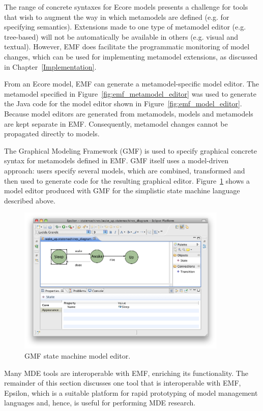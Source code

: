 The range of concrete syntaxes for Ecore models presents a challenge for tools that wish to augment the way in which metamodels are defined (e.g. for specifying semantics). Extensions made to one type of metamodel editor (e.g. tree-based) will not be automatically be available in others (e.g. visual and textual). However, EMF does facilitate the programmatic monitoring of model changes, which can be used for implementing metamodel extensions, as discussed in Chapter~\ref{Implementation}. 

From an Ecore model, EMF can generate a metamodel-specific model editor. The metamodel specified in Figure~\ref{fig:emf_metamodel_editor} was used to generate the Java code for the model editor shown in Figure~\ref{fig:emf_model_editor}. Because model editors are generated from metamodels, models and metamodels are kept separate in EMF. Consequently, metamodel changes cannot be propagated directly to models.

The Graphical Modeling Framework (GMF) \cite{gronback09emp} is used to specify graphical concrete syntax for metamodels defined in EMF. GMF itself uses a model-driven approach: users specify several models, which are combined, transformed and then used to generate code for the resulting graphical editor. Figure~\ref{fig:gmf_model_editor} shows a model editor produced with GMF for the simplistic state machine language described above.

\begin{figure}[htbp]
  \begin{center}
    \leavevmode
    \includegraphics[width=10cm]{2.Background/images/gmf_model_editor.png}
  \end{center}
  \caption{GMF state machine model editor.}
  \label{fig:gmf_model_editor}
\end{figure}

Many MDE tools are interoperable with EMF, enriching its functionality. The remainder of this section discusses one tool that is interoperable with EMF, Epsilon, which is a suitable platform for rapid prototyping of model management languages and, hence, is useful for performing MDE research.

